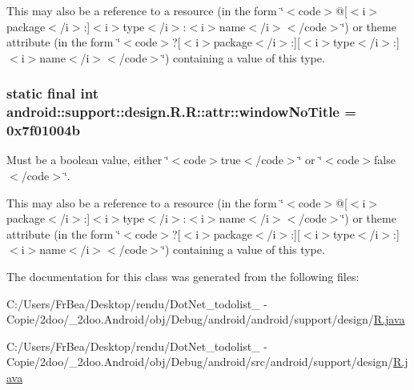 This may also be a reference to a resource (in the form \char`\"{}$<$code$>$@\mbox{[}$<$i$>$package$<$/i$>$:\mbox{]}$<$i$>$type$<$/i$>$:$<$i$>$name$<$/i$>$$<$/code$>$\char`\"{}) or theme attribute (in the form \char`\"{}$<$code$>$?\mbox{[}$<$i$>$package$<$/i$>$:\mbox{]}\mbox{[}$<$i$>$type$<$/i$>$:\mbox{]}$<$i$>$name$<$/i$>$$<$/code$>$\char`\"{}) containing a value of this type. \hypertarget{classandroid_1_1support_1_1design_1_1_r_1_1attr_412a8ae293fd771d1761f1e9a461d881}{
\subsubsection[{windowNoTitle}]{\setlength{\rightskip}{0pt plus 5cm}static final int android::support::design.R.R::attr::windowNoTitle = 0x7f01004b}}
\label{classandroid_1_1support_1_1design_1_1_r_1_1attr_412a8ae293fd771d1761f1e9a461d881}


Must be a boolean value, either \char`\"{}$<$code$>$true$<$/code$>$\char`\"{} or \char`\"{}$<$code$>$false$<$/code$>$\char`\"{}. 

This may also be a reference to a resource (in the form \char`\"{}$<$code$>$@\mbox{[}$<$i$>$package$<$/i$>$:\mbox{]}$<$i$>$type$<$/i$>$:$<$i$>$name$<$/i$>$$<$/code$>$\char`\"{}) or theme attribute (in the form \char`\"{}$<$code$>$?\mbox{[}$<$i$>$package$<$/i$>$:\mbox{]}\mbox{[}$<$i$>$type$<$/i$>$:\mbox{]}$<$i$>$name$<$/i$>$$<$/code$>$\char`\"{}) containing a value of this type. 

The documentation for this class was generated from the following files:\begin{CompactItemize}
\item 
C:/Users/FrBea/Desktop/rendu/DotNet\_\-todolist\_ - Copie/2doo/\_\-2doo.Android/obj/Debug/android/android/support/design/\hyperlink{android_2support_2design_2_r_8java}{R.java}\item 
C:/Users/FrBea/Desktop/rendu/DotNet\_\-todolist\_ - Copie/2doo/\_\-2doo.Android/obj/Debug/android/src/android/support/design/\hyperlink{src_2android_2support_2design_2_r_8java}{R.java}\end{CompactItemize}
